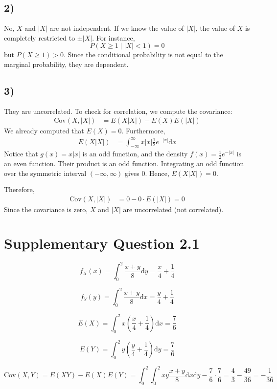 \documentclass[a4paper, UTF-8]{article}
\theoremstyle{plain}
\begin{document}
\subsection{2)} 

No, $X$ and $|X|$ are not independent. If we know the value of $|X|$, the value of $X$ is completely restricted to $\pm |X|$. For instance, 
$$ P(X \ge 1 \mid |X| < 1) = 0 $$
but $P(X \ge 1) > 0$. Since the conditional probability is not equal to the marginal probability, they are dependent.

\subsection{3)} 

They are uncorrelated. To check for correlation, we compute the covariance:
\begin{align*}
\text{Cov}(X, |X|) & = E(X|X|) - E(X)E(|X|)
\end{align*}
We already computed that $E(X) = 0$. Furthermore,
\begin{align*}
E(X|X|) & = \int_{-\infty}^{\infty} x|x| \frac{1}{2} e^{-|x|} \mathrm{d}x
\end{align*}
Notice that $g(x) = x|x|$ is an odd function, and the density $f(x) = \frac{1}{2} e^{-|x|}$ is an even function. Their product is an odd function. Integrating an odd function over the symmetric interval $(-\infty, \infty)$ gives $0$. Hence, $E(X|X|) = 0$. 

Therefore,
\begin{align*}
\text{Cov}(X, |X|) & = 0 - 0 \cdot E(|X|) = 0 
\end{align*}
Since the covariance is zero, $X$ and $|X|$ are uncorrelated (not correlated).

\section{Supplementary Question 2.1} 

$$
f_X(x) = \int_{0}^{2} \frac{x+y}{8} \mathrm{d}y = \frac{x}{4} + \frac{1}{4}
$$

$$
f_Y(y) = \int_{0}^{2} \frac{x+y}{8} \mathrm{d}x = \frac{y}{4} + \frac{1}{4}
$$

$$
E(X) = \int_{0}^{2} x\left(\frac{x}{4} + \frac{1}{4}\right) \mathrm{d}x = \frac{7}{6}
$$

$$
E(Y) = \int_{0}^{2} y\left(\frac{y}{4} + \frac{1}{4}\right) \mathrm{d}y = \frac{7}{6} 
$$

$$
\text{Cov}(X, Y) = E(XY) - E(X)E(Y) = \int_{0}^{2}\int_{0}^{2} xy \frac{x+y}{8} \mathrm{d}x\mathrm{d}y - \frac{7}{6}\cdot\frac{7}{6} = \frac{4}{3} - \frac{49}{36} = -\frac{1}{36}
$$
\end{document}
